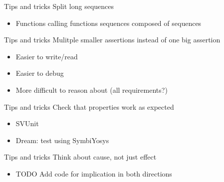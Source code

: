 \documentclass{beamer}
\begin{document}
\begin{frame}{Tips and tricks}
Split long sequences

\begin{itemize}
 \item Functions calling functions \textrightarrow{} sequences composed of sequences
\end{itemize}
\end{frame}


\begin{frame}{Tips and tricks}
Mulitple smaller assertions instead of one big assertion

\begin{itemize}
 \item Easier to write/read
 \item Easier to debug
 \item More difficult to reason about (all requirements?)
\end{itemize}
\end{frame}


\begin{frame}{Tips and tricks}
Check that properties work as expected

\begin{itemize}
 \item SVUnit
 \item Dream: test using SymbiYosys
\end{itemize}
\end{frame}


\begin{frame}{Tips and tricks}
Think about cause, not just effect

\begin{itemize}
 \item TODO Add code for implication in both directions
\end{itemize}
\end{frame}
\end{document}
